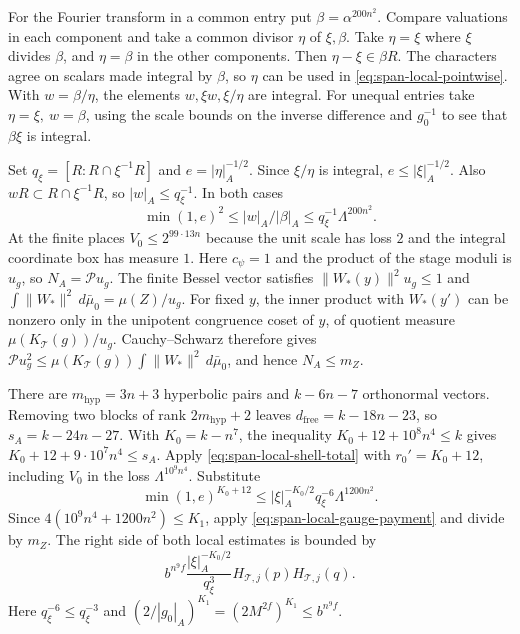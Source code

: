 For the Fourier transform in a common entry put \(\beta=\alpha^{200n^2}\).
Compare valuations in each component and take a common divisor
\(\eta\) of \(\xi,\beta\). Take \(\eta=\xi\) where \(\xi\) divides
\(\beta\), and \(\eta=\beta\) in the other components. Then
\(\eta-\xi\in\beta R\). The characters agree on scalars made integral
by \(\beta\), so \(\eta\) can be used in
\eqref{eq:span-local-pointwise}. With \(w=\beta/\eta\),
the elements \(w,\xi w,\xi/\eta\) are integral. For unequal entries
take \(\eta=\xi,\ w=\beta\), using the scale bounds on the inverse
difference and \(g_0^{-1}\) to see that \(\beta\xi\) is integral.

Set \(q_\xi=[R:R\cap\xi^{-1}R]\) and \(e=|\eta|_A^{-1/2}\).
Since \(\xi/\eta\) is integral, \(e\le|\xi|_A^{-1/2}\).
Also \(wR\subset R\cap\xi^{-1}R\), so \(|w|_A\le q_\xi^{-1}\).
In both cases
\[
 \min(1,e)^2\le |w|_A/|\beta|_A
               \le q_\xi^{-1}\Lambda^{200n^2}.
\]
At the finite places \(V_0\le2^{99\cdot13n}\) because the unit scale
has loss \(2\) and the integral coordinate box has measure \(1\).
Here \(c_\psi=1\) and the product of the stage moduli is \(u_g\), so
\(N_A=\mathcal P u_g\). The finite Bessel vector satisfies
\(\|W_\ast(y)\|^2u_g\le1\) and
\(\int\|W_\ast\|^2\,d\bar\mu_0=\mu(Z)/u_g\).
For fixed \(y\), the inner product with \(W_\ast(y')\) can be nonzero
only in the unipotent congruence coset of \(y\), of quotient measure
\(\mu(K_{\mathcal T}(g))/u_g\). Cauchy--Schwarz therefore gives
\(\mathcal P u_g^2\le\mu(K_{\mathcal T}(g))\int\|W_\ast\|^2\,d\bar\mu_0\),
and hence \(N_A\le m_Z\).

There are \(m_\mathrm{hyp}=3n+3\) hyperbolic pairs and \(k-6n-7\)
orthonormal vectors. Removing two blocks of rank \(2m_\mathrm{hyp}+2\)
leaves \(d_{\mathrm{free}}=k-18n-23\), so \(s_A=k-24n-27\).
With \(K_0=k-n^7\), the inequality \(K_0+12+10^8n^4\le k\)
gives \(K_0+12+9\cdot10^7n^4\le s_A\).
Apply \eqref{eq:span-local-shell-total} with \(r_0'=K_0+12\),
including \(V_0\) in the loss \(\Lambda^{10^9n^4}\).
Substitute
\[
 \min(1,e)^{K_0+12}\le
    |\xi|_A^{-K_0/2}q_\xi^{-6}\Lambda^{1200n^2}.
\]
Since \(4(10^9n^4+1200n^2)\le K_1\), apply
\eqref{eq:span-local-gauge-payment} and divide by \(m_Z\).
The right side of both local estimates is bounded by
\begin{equation}\label{eq:span-finite-decay}
 b^{n^9f}\frac{|\xi|_A^{-K_0/2}}{q_\xi^3}
            H_{\mathcal T,j}(p)H_{\mathcal T,j}(q).
\end{equation}
Here \(q_\xi^{-6}\le q_\xi^{-3}\) and
\((2/|g_0|_A)^{K_1}=(2M^{2f})^{K_1}\le b^{n^9f}\).

